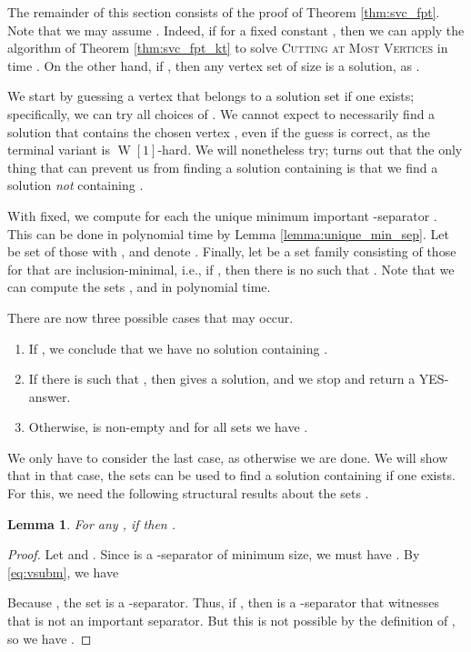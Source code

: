 \documentclass[a4paper,11pt]{article}
\newtheorem{lemma}[theorem]{Lemma}
\theoremstyle{definition}
\theoremstyle{remark}
\DeclareMathOperator{\operatorClassW}{W}
\newcommand{\classW}[1]{\ensuremath{\operatorClassW[#1]}}
\begin{document}
The remainder of this section consists of the proof of Theorem \ref{thm:svc_fpt}. Note that we may assume . Indeed, if  for a fixed constant ,  then we can apply the algorithm of Theorem \ref{thm:svc_fpt_kt} to solve \textsc{Cutting at Most   Vertices} in time . On the other hand, if , then any vertex set  of size  is a solution, as .

We start by guessing a vertex  that belongs to a solution set  if one exists; specifically, we can try all choices of . We cannot expect to necessarily find a solution  that contains the chosen vertex , even if the guess is correct, as the terminal variant is \classW{1}-hard. We will nonetheless try; turns out that the only thing that can prevent us from finding a solution containing  is that we find a solution \emph{not} containing .

With  fixed, we compute for each  the unique minimum important -separator . This can be done in polynomial time by Lemma \ref{lemma:unique_min_sep}. Let  be set of those  with , and denote . Finally, let  be a set family consisting of those  for  that are inclusion-minimal,
i.e., if , then there is no  such that . 
Note that we can compute the sets ,  and  in polynomial time.

There are now three possible cases that may occur.
\begin{enumerate}
    \item If , we conclude that we have no solution containing .
    \item If there is  such that , then  gives a solution, and we stop and return a YES-answer.
    \item Otherwise,  is non-empty and for all sets  we have .
\end{enumerate}
We only have to consider the last case, as otherwise we are done. We will show that in that case, the sets  can be used to find a solution  containing  if one exists. For this, we need the following structural results about the sets .

\begin{lemma}\label{lemma:R_containment}
For any , if  then .
\end{lemma}

\begin{proof}
Let  and . Since  is a -separator of minimum size, we must have . By \eqref{eq:vsubm}, we have

Because , the set  is a -separator.
Thus, if , then  is a -separator that witnesses that  is not an important separator. But this is not possible by the definition of , so we have .
\end{proof}
\end{document}
